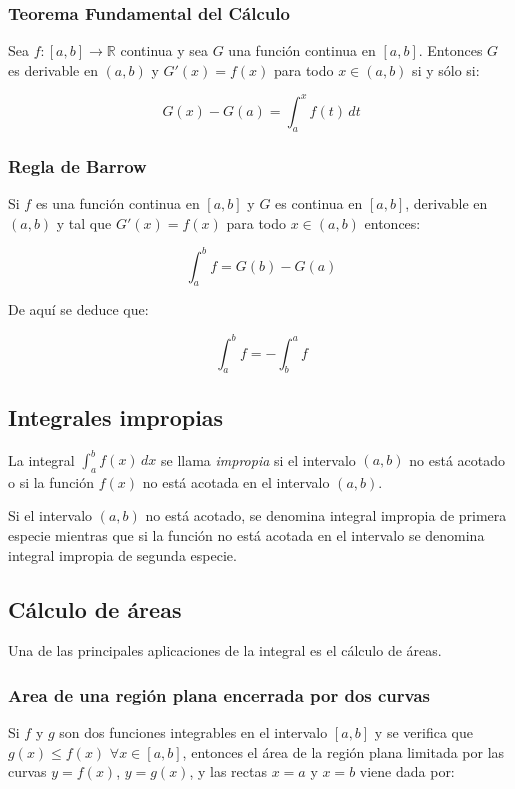 \subsubsection*{Teorema Fundamental del Cálculo}

Sea $f : [a,b]\rightarrow\mathbb{R}$ continua y sea $G$ una función
continua en $[a,b]$. Entonces $G$ es derivable en $(a,b)$ y
$G'(x)=f(x)$ para todo $x\in(a,b)$ si y sólo si:

\[
\ G(x)-G(a) = \int_{a}^{x}f(t)\,dt
\]

\subsubsection*{Regla de Barrow}

Si $f$ es una función continua en $[a,b]$ y $G$ es continua en
$[a,b]$, derivable en $(a,b)$ y tal que $G'(x)=f(x)$ para todo
$x\in(a,b)$ entonces:

\[
\  \int_{a}^{b}{f} = G(b)-G(a)
\]


De aquí se deduce que:

\[
\  \int_{a}^{b}{f} = -\int_{b}^{a}{f}
\]


\subsection*{Integrales impropias}

La integral $ \int_{a}^{b}{f(x)\,dx}$ se llama \emph{impropia} si el intervalo
$(a,b)$ no está acotado o si la función $f(x)$ no está acotada en el intervalo
$(a,b)$.

Si el intervalo $(a,b)$ no está acotado, se denomina integral impropia de primera especie mientras que si la función no está acotada en el intervalo se denomina integral impropia de segunda especie.

\subsection*{Cálculo de áreas}
Una de las principales aplicaciones de la integral es el cálculo de áreas.

\subsubsection*{Area de una región plana encerrada por dos curvas}

Si $f$ y $g$ son dos funciones integrables en el intervalo $[a,b]$ y
se verifica que $g(x)\leq f(x)$ $\forall x\in[a,b]$, entonces el
área de la región plana limitada por las curvas $y=f(x)$, $y=g(x)$,
y las rectas $x=a$ y $x=b$ viene dada por:

